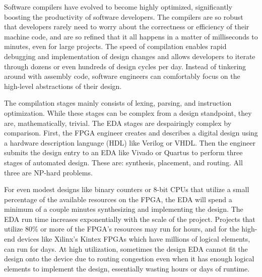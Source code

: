 \documentclass{article}
\begin{document}
Software compilers have evolved to become highly optimized, significantly boosting the productivity of software developers. 
The compilers are so robust that developers rarely need to worry about the correctness or efficiency of their machine code, and are so refined that it all happens in a matter of milliseconds to minutes, even for large projects. %
The speed of compilation enables rapid debugging and implementation of design changes and allows developers to iterate through dozens or even hundreds of design cycles per day.
Instead of tinkering around with assembly code, software engineers can comfortably focus on the high-level abstractions of their design. 


The compilation stages mainly consists of lexing, parsing, and instruction optimization.
While these stages can be complex from a design standpoint, they are, mathematically, trivial.
The EDA stages are despairingly complex by comparison. 
First, the FPGA engineer creates and describes a digital design using a hardware description language (HDL) like Verilog or VHDL.     
Then the engineer submits the design entry to an EDA like Vivado or Quartus to perform three stages of automated design. 
These are: synthesis, placement, and routing. 
All three are NP-hard problems.


For even modest designs like binary counters or 8-bit CPUs that utilize a small percentage of the available resources on the FPGA, the EDA will spend a minimum of a couple minutes synthesizing and implementing the design.
The EDA run time increases exponentially with the scale of the project. 
Projects that utilize 80\% or more of the FPGA's resources may run for hours, and for the high-end devices like Xilinx's Kintex FPGAs which have millions of logical elements, can run for days.
At high utilization, sometimes the design EDA cannot fit the design onto the device due to routing congestion even when it has enough logical elements to implement the design, essentially wasting hours or days of runtime. 
\end{document}
